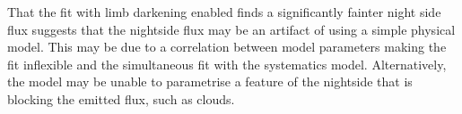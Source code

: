 \documentclass[a4paper,fleqn,usenatbib]{mnras}
\begin{document}

That the fit with limb darkening enabled finds a significantly fainter night side flux suggests that the nightside flux may be an artifact of using a simple physical model. This may be due to a correlation between model parameters making the fit inflexible and the simultaneous fit with the systematics model. Alternatively, the model may be unable to parametrise a feature of the nightside that is blocking the emitted flux, such as clouds.

\end{document}
